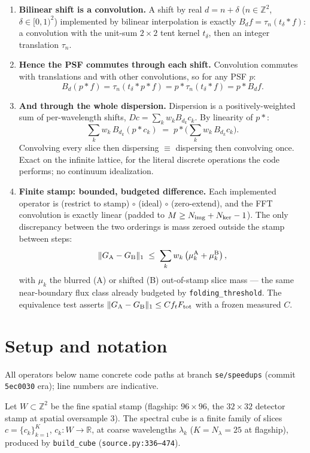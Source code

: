 \documentclass[11pt]{article}
\newcommand{\R}{\mathbb{R}}
\newcommand{\Z}{\mathbb{Z}}
\newcommand{\conv}{\ast}
\newcommand{\code}[1]{\texttt{#1}}
\begin{document}
\begin{enumerate}
\item \textbf{Bilinear shift is a convolution.} A shift by real
$d = n + \delta$ ($n \in \Z^2$, $\delta \in [0,1)^2$) implemented by
bilinear interpolation is exactly $B_d f = \tau_n(t_\delta \conv f)$: a
convolution with the unit-sum $2\times2$ tent kernel $t_\delta$, then an
integer translation $\tau_n$.
\item \textbf{Hence the PSF commutes through each shift.} Convolution
commutes with translations and with other convolutions, so for any PSF $p$:
\[
B_d(p \conv f) = \tau_n(t_\delta \conv p \conv f)
= p \conv \tau_n(t_\delta \conv f) = p \conv B_d f .
\]
\item \textbf{And through the whole dispersion.} Dispersion is a
positively-weighted sum of per-wavelength shifts,
$D c = \sum_k w_k B_{d_k} c_k$. By linearity of $p \conv {}$:
\[
\sum_k w_k\, B_{d_k}(p \conv c_k)
\;=\;
p \conv \Big( \sum_k w_k\, B_{d_k} c_k \Big).
\]
Convolving every slice then dispersing $\equiv$ dispersing then convolving
once. Exact on the infinite lattice, for the literal discrete operations the
code performs; no continuum idealization.
\item \textbf{Finite stamp: bounded, budgeted difference.} Each implemented
operator is (restrict to stamp) $\circ$ (ideal) $\circ$ (zero-extend), and
the FFT convolution is exactly linear (padded to
$M \ge N_{\rm img} + N_{\rm ker} - 1$). The only discrepancy between the two
orderings is mass zeroed outside the stamp between steps:
\[
\| G_{\rm A} - G_{\rm B} \|_1 \;\le\; \sum_k w_k \left( \mu_k^{\rm A} +
\mu_k^{\rm B} \right),
\]
with $\mu_k$ the blurred (A) or shifted (B) out-of-stamp slice mass --- the
same near-boundary flux class already budgeted by
\code{folding\_threshold}. The equivalence test asserts
$\|G_{\rm A}-G_{\rm B}\|_1 \le C f_t F_{\rm tot}$ with a frozen measured
$C$.
\end{enumerate}

\section{Setup and notation}
\label{sec:setup}

All operators below name concrete code paths at branch \code{se/speedups}
(commit \code{5ec0030} era); line numbers are indicative.

Let $W \subset \Z^2$ be the fine spatial stamp (flagship: $96\times96$, the
$32\times32$ detector stamp at spatial oversample 3). The spectral cube is a
finite family of slices $c = \{c_k\}_{k=1}^{K}$, $c_k : W \to \R$, at coarse
wavelengths $\lambda_k$ ($K = N_\lambda = 25$ at flagship), produced by
\code{build\_cube} (\code{source.py:336--474}).
\end{document}
